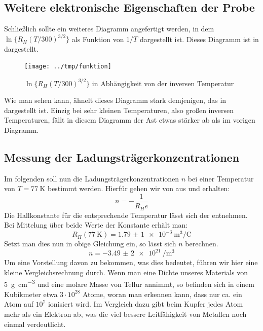 \subsection{Weitere elektronische Eigenschaften der Probe}

Schließlich sollte ein weiteres Diagramm angefertigt werden, in dem
$\ln\{R_H(T/300)^{3/2}\}$ als Funktion von $1/T$ dargestellt ist. Dieses
Diagramm ist in  dargestellt.

\begin{figure}[htb]
   \centering
   \texttt{[image: ../tmp/funktion]}
   \caption{$\ln\{R_H(T/300)^{3/2}\}$ in Abhängigkeit von der inversen
   Temperatur}
   \label{fig:funktion}
\end{figure}

Wie man sehen kann, ähnelt dieses Diagramm stark demjenigen, das in
 dargestellt ist. Einzig bei sehr kleinen Temperaturen,
also großen inversen Temperaturen, fällt in diesem Diagramm der Ast etwas
stärker ab als im vorigen Diagramm.

\subsection{Messung der Ladungsträgerkonzentrationen}

Im folgenden soll nun die Ladungsträgerkonzentrationen $n$ bei einer Temperatur von
$T = \SI{77}{\kelvin}$ bestimmt werden. Hierfür gehen wir von 
aus
und erhalten:
\begin{equation}
 n = -\frac{1}{R_H e}
\end{equation}
Die Hallkonstante für die entsprechende Temperatur lässt sich der
 entnehmen. Bei Mittelung über beide Werte der Konstante
erhält man:
\begin{equation*}
 R_H(\SI{77}{\kelvin}) = \SI{1,79(1)e-3}{\meter\cubed\per\coulomb}
\end{equation*}
Setzt man dies nun in obige Gleichung ein, so lässt sich $n$ berechnen.
\begin{equation*}
 n = \SI{-3,49(2)e21}{\per\meter\cubed}
\end{equation*}
Um eine Vorstellung davon zu bekommen, was dies bedeutet, führen wir hier eine
kleine Vergleichsrechnung durch. Wenn man eine Dichte unseres Materials von
\SI{5}{\gram\centi\meter\tothe{-3}} und eine molare Masse von Tellur annimmt,
so befinden sich in einem Kubikmeter etwa $3\cdot 10^{28}$ Atome, woran man
erkennen kann, dass nur ca. ein Atom auf $10^7$ ionisiert wird. Im Vergleich
dazu gibt beim Kupfer jedes Atom mehr als ein Elektron ab, was die viel bessere
Leitfähigkeit von Metallen noch einmal verdeutlicht.


